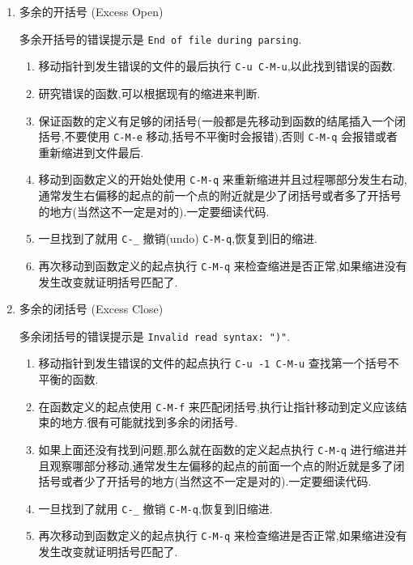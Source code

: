 \documentclass[11pt]{article}
\begin{document}
\begin{enumerate}
\item 多余的开括号 (Excess Open)
\label{sec:org199773d}

多余开括号的错误提示是 \texttt{End of file during parsing}.

\begin{enumerate}
\item 移动指针到发生错误的文件的最后执行 \texttt{C-u C-M-u},以此找到错误的函数.

\item 研究错误的函数,可以根据现有的缩进来判断.

\item 保证函数的定义有足够的闭括号(一般都是先移动到函数的结尾插入一个闭括号,不要使用 \texttt{C-M-e} 移动,括号不平衡时会报错),否则 \texttt{C-M-q} 会报错或者重新缩进到文件最后.

\item 移动到函数定义的开始处使用 \texttt{C-M-q} 来重新缩进并且过程哪部分发生右动,通常发生右偏移的起点的前一个点的附近就是少了闭括号或者多了开括号的地方(当然这不一定是对的).一定要细读代码.

\item 一旦找到了就用 \texttt{C-\_} 撤销(undo) \texttt{C-M-q},恢复到旧的缩进.

\item 再次移动到函数定义的起点执行 \texttt{C-M-q} 来检查缩进是否正常,如果缩进没有发生改变就证明括号匹配了.
\end{enumerate}


\item 多余的闭括号 (Excess Close)
\label{sec:orgacb1796}

多余闭括号的错误提示是 \texttt{Invalid read syntax: ")"}.

\begin{enumerate}
\item 移动指针到发生错误的文件的起点执行 \texttt{C-u -1 C-M-u} 查找第一个括号不平衡的函数.

\item 在函数定义的起点使用 \texttt{C-M-f} 来匹配闭括号,执行让指针移动到定义应该结束的地方.很有可能就找到多余的闭括号.

\item 如果上面还没有找到问题,那么就在函数的定义起点执行 \texttt{C-M-q} 进行缩进并且观察哪部分移动,通常发生左偏移的起点的前面一个点的附近就是多了闭括号或者少了开括号的地方(当然这不一定是对的).一定要细读代码.

\item 一旦找到了就用 \texttt{C-\_} 撤销 \texttt{C-M-q},恢复到旧缩进.

\item 再次移动到函数定义的起点执行 \texttt{C-M-q} 来检查缩进是否正常,如果缩进没有发生改变就证明括号匹配了.
\end{enumerate}
\end{enumerate}
\end{document}
